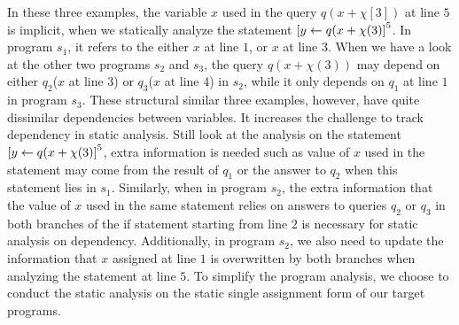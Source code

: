 In these three examples, the variable $x$ used in the query $q(x+\chi[3])$ at line $5$ is implicit, when we statically analyze the statement $\left[ \mathrel{ y \leftarrow q(x+\chi(3) } \right]^{5}$. In program $s_1$, it refers to the either $x$ at line $1$, or $x$ at line $3$.  When we have a look at the other two programs $s_2$ and $s_3$, the query $q(x+\chi(3))$ may depend on either $q_2$($x$ at line $3$) or $q_3$($x$ at line $4$) in $s_2$, while it only depends on $q_1$ at line $1$ in program $s_3$. These structural similar three examples, however, have quite dissimilar dependencies between variables. It increases the challenge to track dependency in static analysis. Still look at the analysis on the statement $\left[ \mathrel{ y \leftarrow q(x+\chi(3) } \right]^{5}$, extra information is needed such as value of $x$ used in the statement may come from the result of $q_1$ or the answer to $q_2$ when this statement lies in $s_1$. Similarly, when in program $s_2$, the extra information that the value of $x$ used in the same statement relies on answers to queries $q_2$ or $q_3$ in both branches of the if statement starting from line $2$ is necessary for static analysis on dependency. Additionally, in program $s_2$, we also need to update the information that $x$ assigned at line $1$ is overwritten by both branches when analyzing the statement at line $5$.   To simplify the program analysis, we choose to conduct the static analysis on the static single assignment form of our target programs.   
%
%
%
